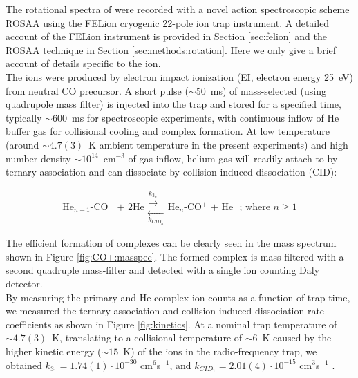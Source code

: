 The rotational spectra of \co  were recorded with a novel action spectroscopic scheme ROSAA using the FELion cryogenic 22-pole ion trap instrument. A detailed account of the FELion instrument is provided in Section \ref{sec:felion} and the ROSAA technique in Section \ref{sec:methods:rotation}. Here we only give a brief account of details specific to the \co ion. \\

The ions were produced by electron impact ionization (EI, electron energy 25~eV) from neutral CO precursor. A short pulse ($\sim$50~ms) of mass-selected (using quadrupole mass filter) \co is injected into the trap and stored for a specified time, typically $\sim$600~ms for spectroscopic experiments, with continuous inflow of He buffer gas for collisional cooling and complex formation. At low temperature (around $\sim 4.7(3)$~K ambient temperature in the present experiments) and high number density $\sim10^{14}$~cm$^{-3}$ of gas inflow, helium gas will readily attach to \co by ternary association and can dissociate by collision induced dissociation (CID): 


\begin{equation}
\text{He$_{n-1}$-CO$^+$ + 2He}
\substack{\overset{k_{3_n}} \longrightarrow \\ \underset{k_{CID_n}} \longleftarrow}
\text{He$_n$-CO$^+$ + He }
\text{ ; where $n\geq 1$}
\label{eqn:fulleq}
\end{equation}

The efficient formation of complexes can be clearly seen in the mass spectrum shown in Figure \ref{fig:CO+:masspec}. The formed complex is mass filtered with a second quadruple mass-filter and detected with a single ion counting Daly detector\cite{daly_scintillation_1960}. \\

By measuring the primary \co and He-\co complex ion counts as a function of trap time, we measured the ternary association and collision induced dissociation rate coefficients as shown in Figure \ref{fig:kinetics}. At a nominal trap temperature of  $\sim 4.7(3)$~K, translating to a collisional temperature of $ \sim 6$~K caused by the higher kinetic energy ($\sim 15$~K) of the ions in the radio-frequency trap, we obtained $k_{3_1}=1.74(1)\cdot10^{-30}$ cm$^6$s$^{-1}$, and  $k_{CID_1}=2.01(4)\cdot10^{-15}$ cm$^3$s$^{-1}$ .\\

